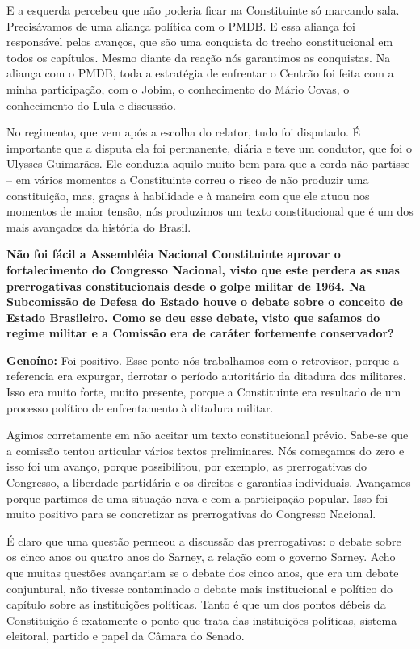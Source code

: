 E a esquerda percebeu que não poderia ficar na Constituinte só marcando
sala. Precisávamos de uma aliança política com o PMDB. E essa aliança
foi responsável pelos avanços, que são uma conquista do trecho
constitucional em todos os capítulos. Mesmo diante da reação nós
garantimos as conquistas. Na aliança com o PMDB, toda a estratégia de
enfrentar o Centrão foi feita com a minha participação, com o Jobim, o
conhecimento do Mário Covas, o conhecimento do Lula e discussão.

No regimento, que vem após a escolha do relator, tudo foi disputado. É
importante que a disputa ela foi permanente, diária e teve um condutor,
que foi o Ulysses Guimarães. Ele conduzia aquilo muito bem para que a
corda não partisse -- em vários momentos a Constituinte correu o risco
de não produzir uma constituição, mas, graças à habilidade e à maneira
com que ele atuou nos momentos de maior tensão, nós produzimos um texto
constitucional que é um dos mais avançados da história do Brasil.

\textbf{Não foi fácil a Assembléia Nacional Constituinte aprovar o
fortalecimento do Congresso Nacional, visto que este perdera as suas
prerrogativas constitucionais desde o golpe militar de 1964. Na
Subcomissão de Defesa do Estado houve o debate sobre o conceito de
Estado Brasileiro. Como se deu esse debate, visto que saíamos do regime
militar e a Comissão era de caráter fortemente conservador?}

\textbf{Genoíno:} Foi positivo. Esse ponto nós trabalhamos com o
retrovisor, porque a referencia era expurgar, derrotar o período
autoritário da ditadura dos militares. Isso era muito forte, muito
presente, porque a Constituinte era resultado de um processo político de
enfrentamento à ditadura militar.

Agimos corretamente em não aceitar um texto constitucional prévio.
Sabe-se que a comissão tentou articular vários textos preliminares. Nós
começamos do zero e isso foi um avanço, porque possibilitou, por
exemplo, as prerrogativas do Congresso, a liberdade partidária e os
direitos e garantias individuais. Avançamos porque partimos de uma
situação nova e com a participação popular. Isso foi muito positivo para
se concretizar as prerrogativas do Congresso Nacional.

É claro que uma questão permeou a discussão das prerrogativas: o debate
sobre os cinco anos ou quatro anos do Sarney, a relação com o governo
Sarney. Acho que muitas questões avançariam se o debate dos cinco anos,
que era um debate conjuntural, não tivesse contaminado o debate mais
institucional e político do capítulo sobre as instituições políticas.
Tanto é que um dos pontos débeis da Constituição é exatamente o ponto
que trata das instituições políticas, sistema eleitoral, partido e papel
da Câmara do Senado.


